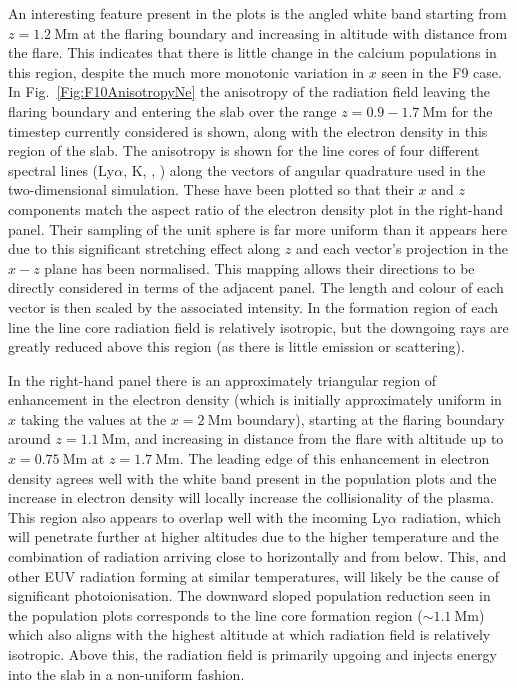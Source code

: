 An interesting feature present in the \Caii{} plots is the angled white band starting from $z=\SI{1.2}{\mega\metre}$ at the flaring boundary and increasing in altitude with distance from the flare.
This indicates that there is little change in the calcium populations in this region, despite the much more monotonic variation in $x$ seen in the F9 case.
In Fig.~\ref{Fig:F10AnisotropyNe} the anisotropy of the radiation field leaving the flaring boundary and entering the slab over the range $z=0.9-\SI{1.7}{\mega\metre}$ for the timestep currently considered is shown, along with the electron density in this region of the slab.
The anisotropy is shown for the line cores of four different spectral lines (Ly$\alpha$, \Caii{} K, \Ha{}, \CaLine{}) along the vectors of angular quadrature used in the two-dimensional simulation.
These have been plotted so that their $x$ and $z$ components match the aspect ratio of the electron density plot in the right-hand panel.
Their sampling of the unit sphere is far more uniform than it appears here due to this significant stretching effect along $z$ and each vector's projection in the $x-z$ plane has been normalised.
This mapping allows their directions to be directly considered in terms of the adjacent panel.
The length and colour of each vector is then scaled by the associated intensity.
In the formation region of each line the line core radiation field is relatively isotropic, but the downgoing rays are greatly reduced above this region (as there is little emission or scattering).

In the right-hand panel there is an approximately triangular region of enhancement in the electron density (which is initially approximately uniform in $x$ taking the values at the $x=\SI{2}{\mega\metre}$ boundary), starting at the flaring boundary around $z=\SI{1.1}{\mega\metre}$, and increasing in distance from the flare with altitude up to $x=\SI{0.75}{\mega\metre}$ at $z=\SI{1.7}{\mega\metre}$.
The leading edge of this enhancement in electron density agrees well with the white band present in the \Caii{} population plots and the increase in electron density will locally increase the collisionality of the plasma.
This region also appears to overlap well with the incoming Ly$\alpha$ radiation, which will penetrate further at higher altitudes due to the higher temperature and the combination of radiation arriving close to horizontally and from below.
This, and other EUV radiation forming at similar temperatures, will likely be the cause of significant photoionisation.
The downward sloped population reduction seen in the \Caii{} population plots corresponds to the line core formation region ($\sim\SI{1.1}{\mega\metre}$) which also aligns with the highest altitude at which \CaLine{} radiation field is relatively isotropic.
Above this, the radiation field is primarily upgoing and injects energy into the slab in a non-uniform fashion.

